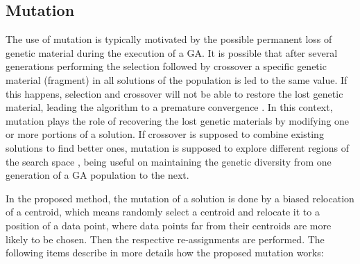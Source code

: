 \subsection{Mutation}
\label{subsec:mutation}
The use of mutation is typically motivated by the possible permanent loss of genetic material during the execution of a GA. It is possible that after several generations performing the selection followed by crossover a specific genetic material (fragment) in all solutions of the population is led to the same value. If this happens, selection and crossover will not be able to restore the lost genetic material, leading the algorithm to a premature convergence \cite{Whitley1994}. In this context, mutation plays the role of recovering the lost genetic materials by modifying one or more portions of a solution. If crossover is supposed to combine existing solutions to find better ones, mutation is supposed to explore different regions of the search space \cite{Srinivas1994}, being useful on maintaining the genetic diversity from one generation of a GA population to the next.

In the proposed method, the mutation of a solution is done by a biased relocation of a centroid, which means randomly select a centroid and relocate it to a position of a data point, where data points far from their centroids are more likely to be chosen. Then the respective re-assignments are performed. The following items describe in more details how the proposed mutation works:

